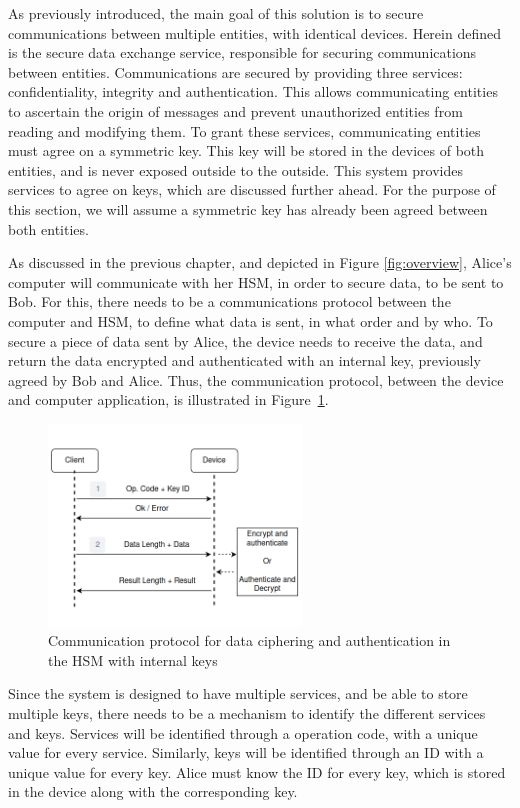 As previously introduced, the main goal of this solution is to secure communications between multiple entities, with identical devices.
Herein defined is the secure data exchange service, responsible for securing communications between entities. 
Communications are secured by providing three services: confidentiality, integrity and authentication. This allows communicating entities to ascertain the origin of messages and prevent unauthorized entities from reading and modifying them.
To grant these services, communicating entities must agree on a symmetric key. This key will be stored in the devices of both entities, and is never exposed outside to the outside.
This system provides services to agree on keys, which are discussed further ahead. For the purpose of this section, we will assume a symmetric key has already been agreed between both entities.

As discussed in the previous chapter, and depicted in Figure \ref{fig:overview}, Alice's computer will communicate with her HSM, in order to secure data, to be sent to Bob. For this, there needs to be a communications protocol between the computer and HSM, to define what data is sent, in what order and by who. To secure a piece of data sent by Alice, the device needs to receive the data, and return the data encrypted and authenticated with an internal key, previously agreed by Bob and Alice.
Thus, the communication protocol, between the device and computer application, is illustrated in Figure~\ref{fig:protocol:data-exchange}.
\begin{figure}[h!]
	\centering
	\includegraphics[width=0.60\textwidth]{./Images/data-exchange.png}
	\caption{Communication protocol for data ciphering and authentication in the HSM with internal keys}
	\label{fig:protocol:data-exchange}
\end{figure}
Since the system is designed to have multiple services, and be able to store multiple keys, there needs to be a mechanism to identify the different services and keys.
Services will be identified through a operation code, with a unique value for every service. Similarly, keys will be identified through an ID with a unique value for every key. Alice must know the ID for every key, which is stored in the device along with the corresponding key.


